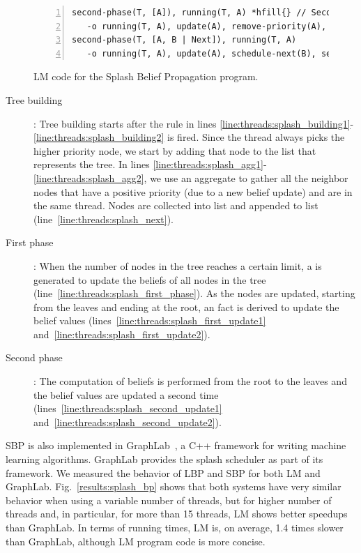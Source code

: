\begin{figure}[!htb]
\begin{Verbatim}[numbers=left,commandchars=*\{\},fontsize=\codesize]
second-phase(T, [A]), running(T, A) *hfill{} // Second phase
   -o running(T, A), update(A), remove-priority(A), start-tree(T).*label{line:threads:splash_second_update1}
second-phase(T, [A, B | Next]), running(T, A)
   -o running(T, A), update(A), schedule-next(B), second-phase(T, [B | Next]).*label{line:threads:splash_second_update2}
\end{Verbatim}

   \caption{LM code for the Splash Belief Propagation program.}
  \label{code:threads:sbp}
\end{figure}


\begin{description}

   \item[Tree building]: Tree building starts after the rule in lines
      \ref{line:threads:splash_building1}-\ref{line:threads:splash_building2} is
      fired. Since the thread always picks the higher priority node, we start by
      adding that node to the list that represents the tree. In lines
      \ref{line:threads:splash_agg1}-\ref{line:threads:splash_agg2}, we use an
      aggregate to gather all the neighbor nodes that have a positive priority
      (due to a new belief update) and are in the same thread. Nodes are
      collected into list  and appended to list 
      (line~\ref{line:threads:splash_next}).

   \item[First phase]: When the number of nodes in the tree reaches a certain
      limit, a  is generated to update the beliefs of all
      nodes in the tree (line~\ref{line:threads:splash_first_phase}). As the
      nodes are updated, starting from the leaves and ending at the root, an
       fact is derived to update the belief values
      (lines~\ref{line:threads:splash_first_update1}
      and~\ref{line:threads:splash_first_update2}).

   \item[Second phase]: The computation of beliefs is performed from the root to
      the leaves and the belief values are updated a second time
      (lines~\ref{line:threads:splash_second_update1}
      and~\ref{line:threads:splash_second_update2}).

\end{description}

SBP is also implemented in GraphLab~\cite{GraphLab2010}, a C++ framework for
writing machine learning algorithms. GraphLab provides the splash scheduler as
part of its framework. We measured the behavior of LBP and SBP for both LM and
GraphLab. Fig.~\ref{results:splash_bp} shows that both systems have very similar
behavior when using a variable number of threads, but for higher number of
threads and, in particular, for more than 15 threads, LM shows better speedups
than GraphLab. In terms of running times, LM is, on average, 1.4 times slower
than GraphLab, although LM program code is more concise.
